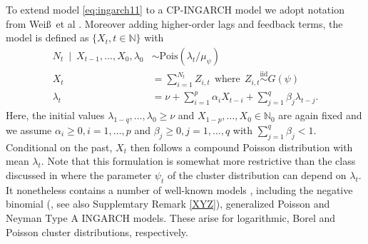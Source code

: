 \documentclass{article}
\begin{document}
To extend model \eqref{eq:ingarch11} to a CP-INGARCH model we adopt notation from Wei\ss\ et al \cite[Sec. 2]{Weiss2017}. Moreover adding higher-order lags and feedback terms, the model is defined as $\{X_t, t \in \mathbb{N}\}$ with %
\begin{align}
N_t \ \mid \ X_{t - 1}, \dots, X_0, \lambda_0 & \sim \text{Pois}(\lambda_t/\mu_\psi) \label{eq:N_CP_original}\\
X_t & = \sum_{i = 1}^{N_t} Z_{i, t} \ \ \text{where} \ \  Z_{i, t} \stackrel{\text{iid}}{\sim} G(\psi)\label{eq:X_CP_original}\\
\lambda_t & = \nu + \sum_{i = 1}^p \alpha_i X_{t - i} + \sum_{j = 1}^q \beta_j \lambda_{t - j}.\label{eq:lambda_CP_original}
\end{align}
Here, the initial values $\lambda_{1 - q}, \dots, \lambda_0 \geq \nu$ and $X_{1 - p}, \dots, X_0 \in \mathbb{N}_0$ are again fixed and we assume $\alpha_i \geq 0, i = 1, \dots, p$ and $\beta_j \geq 0, j = 1, \dots, q$  with $\sum_{j = 1}^q \beta_j < 1$. Conditional on the past, $X_t$ then follows a compound Poisson distribution with mean $\lambda_t$. Note that this formulation is somewhat more restrictive than the class discussed in \citep{Goncalves2015} where the parameter $\psi_t$ of the cluster distribution can depend on $\lambda_t$. It nonetheless contains a number of well-known models \cite[Observation 2]{Goncalves2015}, including the negative binomial (\cite{Xu2012, Weiss2018}, see also Supplemtary Remark \ref{XYZ}), generalized Poisson \cite{Zhu2012} and Neyman Type A \cite{Goncalves2015a} INGARCH models. These arise for logarithmic, Borel and Poisson cluster distributions, respectively.
\end{document}
